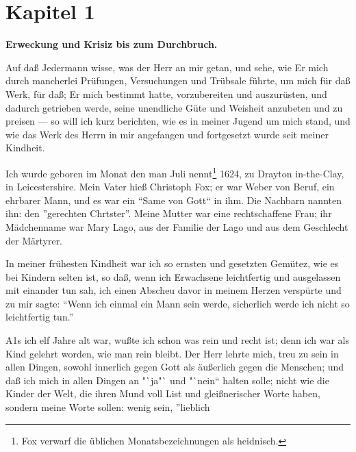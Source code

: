 \section{Kapitel 1}

\begin{center}
\textbf{Erweckung und Krisiz bis zum Durchbruch.}
\end{center}


Auf daß Jedermann wisse, was der Herr an mir getan, und
sehe, wie Er mich durch mancherlei Prüfungen, Versuchungen und
Trübsale führte, um mich für daß Werk, für daß; Er mich bestimmt 
hatte, vorzubereiten und auszurüsten, und dadurch getrieben 
werde, seine unendliche Güte und Weisheit anzubeten und
zu preisen — so will ich kurz berichten, wie es in meiner Jugend
um mich stand, und wie das Werk des Herrn in mir angefangen
und fortgesetzt wurde seit meiner Kindheit.


Ich wurde geboren im Monat den man Juli nennt\footnote{Fox 
verwarf die üblichen Monatsbezeichnungen als heidnisch.} 1624,
zu Drayton in-the-Clay, in Leicestershire. Mein Vater hieß
Christoph Fox; er war Weber von Beruf, ein ehrbarer Mann,
und es war ein "`Same von Gott"` in ihm. Die Nachbarn
nannten ihn: den "'gerechten Chrtster"'. Meine Mutter war eine
rechtschaffene Frau; ihr Mädchenname war Mary Lago, aus der
Familie der Lago und aus dem Geschlecht der Märtyrer.

In meiner frühesten Kindheit war ich so ernsten und gesetzten
Gemütez, wie es bei Kindern selten ist, so daß, wenn ich Erwachsene 
leichtfertig und ausgelassen mit einander tun sah, ich
einen Abscheu davor in meinem Herzen verspürte und zu mir
sagte: "`Wenn ich einmal ein Mann sein werde, sicherlich werde
ich nicht so leichtfertig tun."'

A1s ich elf Jahre alt war, wußte ich schon was rein und
recht ist; denn ich war als Kind gelehrt worden, wie man rein
bleibt. Der Herr lehrte mich, treu zu sein in allen Dingen, sowohl
innerlich gegen Gott als äußerlich gegen die Menschen; und daß
ich mich in allen Dingen an "`ja"` und "`nein"` halten solle; nicht
wie die Kinder der Welt, die ihren Mund voll List und gleißnerischer
Worte haben, sondern meine Worte sollen: wenig sein, "'lieblich





